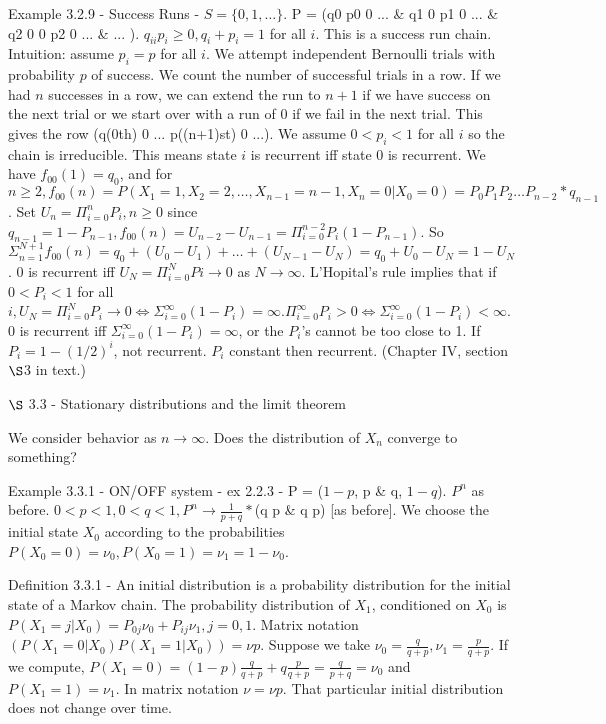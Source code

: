 \documentclass{article}
\begin{document}
Example 3.2.9 - Success Runs - $S = \{0, 1, \dots \}$. P = (q0 p0 0 ... \& q1 0 p1 0 ... \& q2 0 0 p2 0 ... \& ... ). $q_{ii} p_i \ge 0, q_i + p_i = 1$ for all $i$. This is a success run chain. Intuition: assume $p_i = p$ for all $i$. We attempt independent Bernoulli trials with probability $p$ of success. We count the number of successful trials in a row. If we had $n$ successes in a row, we can extend the run to $n + 1$ if we have success on the next trial or we start over with a run of 0 if we fail in the next trial. This gives the row (q(0th) 0 ... p((n+1)st) 0 ...). We assume $0 < p_i < 1$ for all $i$ so the chain is irreducible. This means state $i$ is recurrent iff state 0 is recurrent. We have $f_{00}(1) = q_0$, and for $n \ge 2, f_{00}(n) = P(X_1=1, X_2=2, \dots, X_{n-1}=n-1, X_n=0|X_0=0) = P_0 P_1 P_2 \dots P_{n-2} * q_{n-1}$. Set $U_n = \Pi_{i=0}^n P_i, n \ge 0$ since $q_{n-1} = 1 - P_{n-1}, f_{00}(n) = U_{n-2} - U_{n-1} = \Pi_{i=0}^{n-2} P_i(1 - P_{n-1})$. So $\Sigma_{n=1}^{N+1} f_{00}(n) = q_0 + (U_0 - U_1) + \dots + (U_{N-1} - U_N) = q_0 + U_0 - U_N = 1 - U_N$. 0 is recurrent iff $U_N = \Pi_{i=0}^N Pi \rightarrow 0$ as $N \rightarrow \infty$. L'Hopital's rule implies that if $0 < P_i < 1$ for all $i, U_N = \Pi_{i=0}^N P_i \rightarrow 0 \iff \Sigma_{i=0}^\infty (1-P_i) = \infty. \Pi_{i=0}^\infty P_i > 0 \iff \Sigma_{i=0}^\infty (1-P_i) < \infty$. 0 is recurrent iff $\Sigma_{i=0}^\infty (1-P_i) = \infty$, or the $P_i$'s cannot be too close to 1. If $P_i = 1 - (1/2)^i$, not recurrent. $P_i$ constant then recurrent. (Chapter IV, section $\S$3 in text.)

$\S$ 3.3 - Stationary distributions and the limit theorem

We consider behavior as $n \rightarrow \infty$. Does the distribution of $X_n$ converge to something?

Example 3.3.1 - ON/OFF system - ex 2.2.3 - P = ($1-p$, p \& q, $1-q$). $P^n$ as before. $0 < p < 1, 0 < q < 1, P^n \rightarrow \frac{1}{p + q} * $(q p \& q p) [as before]. We choose the initial state $X_0$ according to the probabilities $P(X_0 = 0) = \nu_0, P(X_0=1) = \nu_1 = 1 - \nu_0$.

Definition 3.3.1 - An initial distribution is a probability distribution for the initial state of a Markov chain. The probability distribution of $X_1$, conditioned on $X_0$ is $P(X_1=j|X_0) = P_{0j} \nu_0 + P_{ij} \nu_1, j = 0, 1$. Matrix notation $(P(X_1=0|X_0) P(X_1=1|X_0)) = \nu p$. Suppose we take $\nu_0 = \frac{q}{q + p}, \nu_1 = \frac{p}{q+p}$. If we compute, $P(X_1=0) = (1-p) \frac{q}{q+p} + q \frac{p}{q+p} = \frac{q}{p+q} = \nu_0$ and $P(X_1=1) = \nu_1$. In matrix notation $\nu = \nu p$. That particular initial distribution does not change over time.
\end{document}
